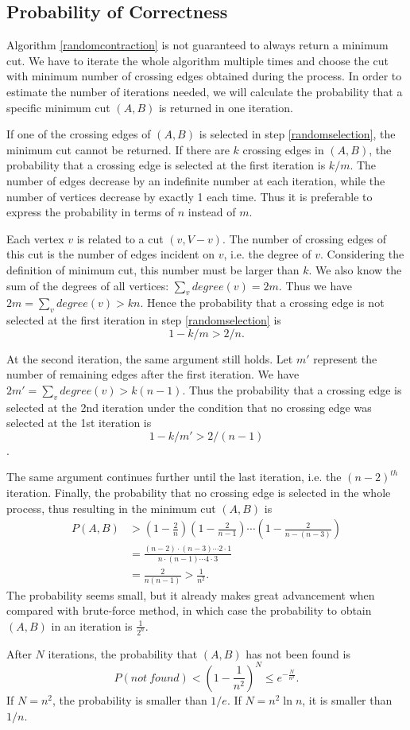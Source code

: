 \subsection{Probability of Correctness}
Algorithm \ref{randomcontraction} is not guaranteed to always return a minimum cut. We have to iterate the whole algorithm multiple times and choose the cut with minimum number of crossing edges obtained during the process. In order to estimate the number of iterations needed, we will calculate the probability that a specific minimum cut $(A,B)$ is returned in one iteration.

If one of the crossing edges of $(A,B)$ is selected in step \ref{randomselection}, the minimum cut cannot be returned. If there are $k$ crossing edges in $(A,B)$, the probability that a crossing edge is selected at the first iteration is $k/m$. The number of edges decrease by an indefinite number at each iteration, while the number of vertices decrease by exactly 1 each time. Thus it is preferable to express the probability in terms of $n$ instead of $m$.

Each vertex $v$ is related to a cut $({v},V-{v})$. The number of crossing edges of this cut is the number of edges incident on $v$, i.e. the degree of $v$. Considering the definition of minimum cut, this number must be larger than $k$. We also know the sum of the degrees of all vertices: $\sum\limits_{v}degree(v)=2m$. Thus we have $2m=\sum\limits_{v}degree(v)>kn$. Hence the probability that a crossing edge is not selected at the first iteration in step \ref{randomselection} is $$1-k/m>2/n.$$

At the second iteration, the same argument still holds. Let $m'$ represent the number of remaining edges after the first iteration. We have $2m'=\sum\limits_{v}degree(v)>k(n-1)$. Thus the probability that a crossing edge is selected at the 2nd iteration under the condition that no crossing edge was selected at the 1st iteration is $$1-k/m'>2/(n-1)$$.

The same argument continues further until the last iteration, i.e. the $(n-2)^{th}$ iteration. Finally, the probability that no crossing edge is selected in the whole process, thus resulting in the minimum cut $(A,B)$ is
\begin{align*}
P(A,B)&>\left(1-\frac{2}{n}\right)\left(1-\frac{2}{n-1}\right)\cdots\left(1-\frac{2}{n-(n-3)}\right)\\
&=\frac{(n-2)\cdot(n-3)\cdots 2\cdot 1}{n\cdot(n-1)\cdots 4\cdot 3}\\
&=\frac{2}{n(n-1)}>\frac{1}{n^2}.
\end{align*}
The probability seems small, but it already makes great advancement when compared with brute-force method, in which case the probability to obtain $(A,B)$ in an iteration is $\frac{1}{2^n}$.

After $N$ iterations, the probability that $(A,B)$ has not been found is 
\begin{equation*}
P(not\:found)<\left(1-\frac{1}{n^2}\right)^N\leq e^{-\frac{N}{n^2}}.
\end{equation*}
If $N=n^2$, the probability is smaller than $1/e$. If $N=n^2\ln n$, it is smaller than $1/n$. 
\ifx\PREAMBLE\undefined

\fi